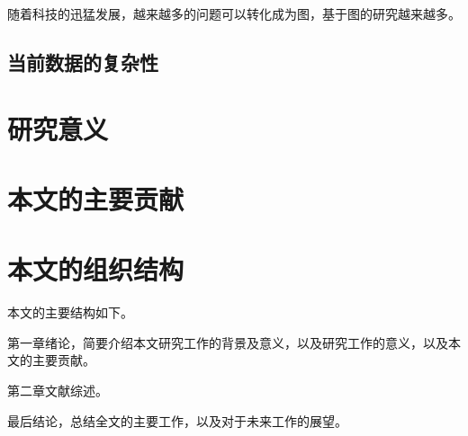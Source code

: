 随着科技的迅猛发展，越来越多的问题可以转化成为图，基于图的研究越来越多。
\cite{Lenard2011}




\subsection{当前数据的复杂性}
\label{subsec1:data_complexity}

\section{研究意义}
\label{sec1:motivation}


\section{本文的主要贡献}
\label{sec1:contribution}


\section{本文的组织结构}
\label{sec1:organization}

本文的主要结构如下。

第一章绪论，简要介绍本文研究工作的背景及意义，以及研究工作的意义，以及本文的主要贡献。

第二章文献综述。

最后结论，总结全文的主要工作，以及对于未来工作的展望。

